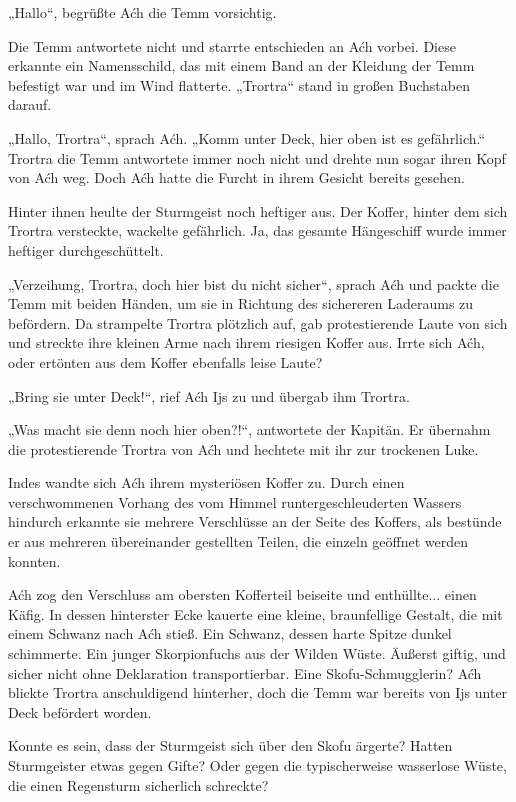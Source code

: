 „Hallo“, begrüßte Aćh die Temm vorsichtig.

Die Temm antwortete nicht und starrte entschieden an Aćh vorbei. Diese erkannte ein Namensschild, das mit einem Band an der Kleidung der Temm befestigt war und im Wind flatterte. „Trortra“ stand in großen Buchstaben darauf.

„Hallo, Trortra“, sprach Aćh. „Komm unter Deck, hier oben ist es gefährlich.“ Trortra die Temm antwortete immer noch nicht und drehte nun sogar ihren Kopf von Aćh weg. Doch Aćh hatte die Furcht in ihrem Gesicht bereits gesehen.

Hinter ihnen heulte der Sturmgeist noch heftiger aus. Der Koffer, hinter dem sich Trortra versteckte, wackelte gefährlich. Ja, das gesamte Hängeschiff wurde immer heftiger durchgeschüttelt.

„Verzeihung, Trortra, doch hier bist du nicht sicher“, sprach Aćh und packte die Temm mit beiden Händen, um sie in Richtung des sichereren Laderaums zu befördern. Da strampelte Trortra plötzlich auf, gab protestierende Laute von sich und streckte ihre kleinen Arme nach ihrem riesigen Koffer aus. Irrte sich Aćh, oder ertönten aus dem Koffer ebenfalls leise Laute?

„Bring sie unter Deck!“, rief Aćh Ijs zu und übergab ihm Trortra.

„Was macht sie denn noch hier oben?!“, antwortete der Kapitän. Er übernahm die protestierende Trortra von Aćh und hechtete mit ihr zur trockenen Luke.

Indes wandte sich Aćh ihrem mysteriösen Koffer zu. Durch einen verschwommenen Vorhang des vom Himmel runtergeschleuderten Wassers hindurch erkannte sie mehrere Verschlüsse an der Seite des Koffers, als bestünde er aus mehreren übereinander gestellten Teilen, die einzeln geöffnet werden konnten.

Aćh zog den Verschluss am obersten Kofferteil beiseite und enthüllte... einen Käfig. In dessen hinterster Ecke kauerte eine kleine, braunfellige Gestalt, die mit einem Schwanz nach Aćh stieß. Ein Schwanz, dessen harte Spitze dunkel schimmerte. Ein junger Skorpionfuchs aus der Wilden Wüste. Äußerst giftig, und sicher nicht ohne Deklaration transportierbar. Eine Skofu-Schmugglerin? Aćh blickte Trortra anschuldigend hinterher, doch die Temm war bereits von Ijs unter Deck befördert worden.

Konnte es sein, dass der Sturmgeist sich über den Skofu ärgerte? Hatten Sturmgeister etwas gegen Gifte? Oder gegen die typischerweise wasserlose Wüste, die einen Regensturm sicherlich schreckte?

